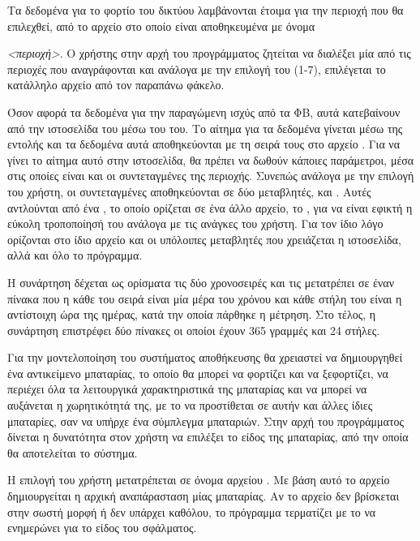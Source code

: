 \documentclass[12pt]{report}
\begin{document}
Τα δεδομένα για το φορτίο του δικτύου λαμβάνονται έτοιμα για την περιοχή που θα επιλεχθεί, από το αρχείο στο οποίο
είναι αποθηκευμένα με όνομα {{}\textit{<περιοχή>}{}. 
Ο χρήστης στην αρχή του προγράμματος ζητείται να διαλέξει μία από τις περιοχές που αναγράφονται και ανάλογα με την
επιλογή του (1-7), επιλέγεται το κατάλληλο αρχείο από τον παραπάνω φάκελο.

Όσον αφορά τα δεδομένα για την παραγώμενη ισχύς από τα ΦΒ, αυτά κατεβαίνουν από την ιστοσελίδα του 
{} μέσω του {} του. Το αίτημα για τα δεδομένα γίνεται 
μέσω της εντολής {} και τα δεδομένα αυτά αποθηκεύονται με τη σειρά τους στο αρχείο {}.
Για να γίνει το αίτημα αυτό στην ιστοσελίδα, θα πρέπει να δωθούν κάποιες παράμετροι, μέσα στις οποίες είναι και οι 
συντεταγμένες της περιοχής. Συνεπώς ανάλογα με την επιλογή του χρήστη, οι συντεταγμένες αποθηκεύονται σε δύο 
μεταβλητές, {} και {}. Αυτές αντλούνται από ένα {}, το οποίο
ορίζεται σε ένα άλλο αρχείο, το {}, για να είναι εφικτή η εύκολη τροποποίησή του ανάλογα με τις ανάγκες του χρήστη.
Για τον ίδιο λόγο ορίζονται στο ίδιο αρχείο και οι υπόλοιπες μεταβλητές που χρειάζεται η ιστοσελίδα, αλλά και όλο το πρόγραμμα.

Η συνάρτηση {} δέχεται ως ορίσματα τις δύο χρονοσειρές και τις μετατρέπει σε έναν πίνακα που η κάθε του σειρά
είναι μία μέρα του χρόνου και κάθε στήλη του είναι η αντίστοιχη ώρα της ημέρας, κατά την οποία πάρθηκε η μέτρηση. 
Στο τέλος, η συνάρτηση επιστρέφει δύο πίνακες οι οποίοι έχουν 365 γραμμές και 24 στήλες.

Για την μοντελοποίηση του συστήματος αποθήκευσης θα χρειαστεί να δημιουργηθεί ένα αντικείμενο μπαταρίας, το οποίο θα 
μπορεί να φορτίζει και να ξεφορτίζει, να περιέχει όλα τα λειτουργικά χαρακτηριστικά της μπαταρίας και να μπορεί να αυξάνεται
η χωρητικότητά της, με το να προστίθεται σε αυτήν και άλλες ίδιες μπαταρίες, σαν να υπήρχε ένα σύμπλεγμα μπαταριών.
Στην αρχή του προγράμματος δίνεται η δυνατότητα στον χρήστη να επιλέξει το είδος της μπαταρίας, από την οποία θα αποτελείται το σύστημα.

Η επιλογή του χρήστη μετατρέπεται σε όνομα αρχείου {}. Με βάση αυτό το αρχείο δημιουργείται η αρχική αναπάρασταση
μίας μπαταρίας. Αν το αρχείο δεν βρίσκεται στην σωστή μορφή ή δεν υπάρχει καθόλου, το πρόγραμμα τερματίζει με το να ενημερώνει για το
είδος του σφάλματος.

}
\end{document}
